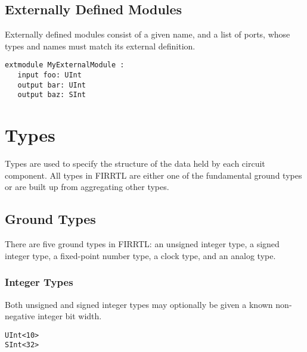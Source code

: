 \documentclass[12pt]{article}
\begin{document}
\subsection{Externally Defined Modules}
Externally defined modules consist of a given name, and a list of ports, whose types and names must match its external definition.

\begin{lstlisting}
extmodule MyExternalModule :
   input foo: UInt
   output bar: UInt
   output baz: SInt
\end{lstlisting}




\section{Types}

Types are used to specify the structure of the data held by each circuit component. All types in FIRRTL are either one of the fundamental ground types or are built up from aggregating other types.

\subsection{Ground Types}

There are five ground types in FIRRTL: an unsigned integer type, a signed integer type, a fixed-point number type, a clock type, and an analog type.

\subsubsection{Integer Types}

Both unsigned and signed integer types may optionally be given a known non-negative integer bit width.

\begin{lstlisting}
UInt<10>
SInt<32>
\end{lstlisting}
\end{document}
